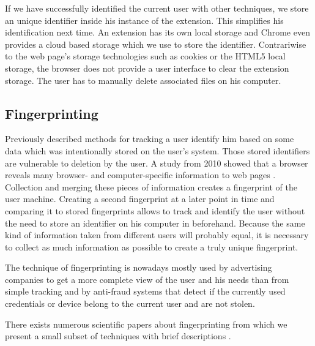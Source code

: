 	If we have successfully identified the current user with other techniques, we store an unique identifier inside his instance of the extension. This simplifies his identification next time. An extension has its own local storage and Chrome even provides a cloud based storage which we use to store the identifier. Contrariwise to the web page's storage technologies such as cookies or the HTML5 local storage, the browser does not provide a user interface to clear the extension storage. The user has to manually delete associated files on his computer.

\subsection{Fingerprinting}

	Previously described methods for tracking a user identify him based on some data which was intentionally stored on the user's system. Those stored identifiers are vulnerable to deletion by the user. A study from 2010 showed that a browser reveals many browser- and computer-specific information to web pages \cite{Eckersley:2010:UYW:1881151.1881152}. Collection and merging these pieces of information creates a fingerprint of the user machine. Creating a second fingerprint at a later point in time and comparing it to stored fingerprints allows to track and identify the user without the need to store an identifier on his computer in beforehand. Because the same kind of information taken from different users will probably equal, it is necessary to collect as much information as possible to create a truly unique fingerprint. 
	
	The technique of fingerprinting is nowadays mostly used by advertising companies to get a more complete view of the user and his needs than from simple tracking and by anti-fraud systems that detect if the currently used credentials or device belong to the current user and are not stolen.

	There exists numerous scientific papers about fingerprinting from which we present a small subset of techniques with brief descriptions \cite{paulstone_historysniffing, MBYS11, Nikiforakis:2013:CME:2497621.2498133, Eckersley:2010:UYW:1881151.1881152, MS12, olejnik:hal-00747841}. 
	
